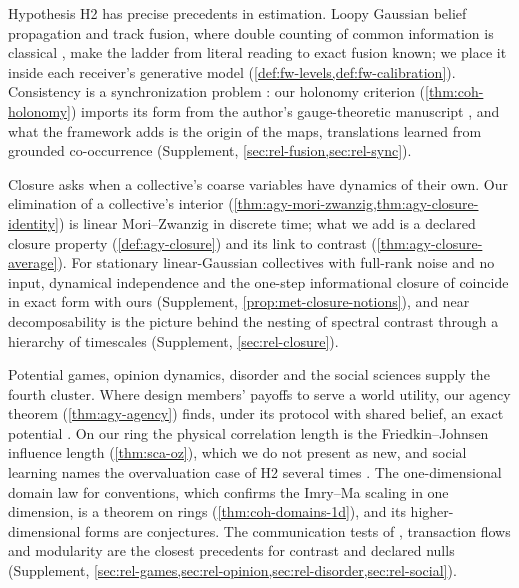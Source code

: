 Hypothesis H2 has precise precedents in estimation. Loopy Gaussian belief propagation \citep{malioutov2006walk,weiss2001correctness} and track fusion, where double counting of common information is classical \citep{barshalom1986effect,julier1997nondivergent,grime1994data}, make the ladder from literal reading to exact fusion known; we place it inside each receiver's generative model (\cref{def:fw-levels,def:fw-calibration}). Consistency is a synchronization problem \citep{singer2011angular,bandeira2013cheeger,abbe2018group}: our holonomy criterion (\cref{thm:coh-holonomy}) imports its form from the author's gauge-theoretic manuscript \citep{dennis2026magent}, and what the framework adds is the origin of the maps, translations learned from grounded co-occurrence (Supplement, \cref{sec:rel-fusion,sec:rel-sync}).

Closure asks when a collective's coarse variables have dynamics of their own. Our elimination of a collective's interior (\cref{thm:agy-mori-zwanzig,thm:agy-closure-identity}) is linear Mori--Zwanzig \citep{zwanzig1961memory,mori1965transport} in discrete time; what we add is a declared closure property (\cref{def:agy-closure}) and its link to contrast (\cref{thm:agy-closure-average}). For stationary linear-Gaussian collectives with full-rank noise and no input, dynamical independence \citep{barnett2023dynamical} and the one-step informational closure of \citet{rosas2024software} coincide in exact form with ours (Supplement, \cref{prop:met-closure-notions}), and near decomposability \citep{simon1961aggregation,simon1962architecture,courtois1977decomposability} is the picture behind the nesting of spectral contrast through a hierarchy of timescales (Supplement, \cref{sec:rel-closure}).

Potential games, opinion dynamics, disorder and the social sciences supply the fourth cluster. Where \citet{wolpert2001optimal} design members' payoffs to serve a world utility, our agency theorem (\cref{thm:agy-agency}) finds, under its protocol with shared belief, an exact potential \citep{monderer1996potential}. On our ring the physical correlation length is the Friedkin--Johnsen influence length \citep{friedkin1990social} (\cref{thm:sca-oz}), which we do not present as new, and social learning names the overvaluation case of H2 several times \citep{demarzo2003persuasion,eyster2010naive,enke2019correlation}. The one-dimensional domain law for conventions, which confirms the Imry--Ma scaling \citep{imry1975random} in one dimension, is a theorem on rings (\cref{thm:coh-domains-1d}), and its higher-dimensional forms are conjectures. The communication tests of \citet{deutsch1953nationalism}, transaction flows \citep{savage1960statistical} and modularity \citep{newman2006modularity} are the closest precedents for contrast and declared nulls (Supplement, \cref{sec:rel-games,sec:rel-opinion,sec:rel-disorder,sec:rel-social}).

